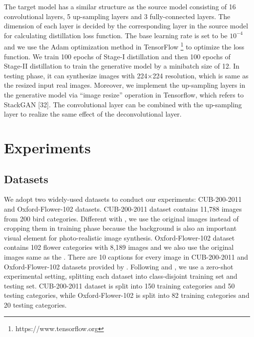 \documentclass[sigconf]{acmart}
\begin{document}
The target model has a similar structure as the source model consisting of 16 convolutional layers, 5 up-sampling layers and 3 fully-connected layers. The dimension of each layer is decided by the corresponding layer in the source model for calculating distillation loss function. The base learning rate is set to be $10^{-4}$ and we use the Adam optimization method \cite{kingma2014adam} in TensorFlow \footnote{https://www.tensorflow.org} to optimize the loss function. We train 100 epochs of Stage-I distillation and then 100 epochs of Stage-II distillation to train the generative model by a minibatch size of 12. In testing phase, it can synthesize images with 224$\times$224 resolution, which is same as the resized input real images. Moreover, we implement the up-sampling layers in the generative model via ``image resize'' operation in Tensorflow, which refers to StackGAN [32]. The convolutional layer can be combined with the up-sampling layer to realize the same effect of the deconvolutional layer.

\section{Experiments}



\subsection{Datasets}
We adopt two widely-used datasets to conduct our experiments: CUB-200-2011 \cite{wah2011caltech} and Oxford-Flower-102 \cite{nilsback2008automated} datasets. CUB-200-2011 dataset contains 11,788 images from 200 bird categories. Different with \cite{zhang2016stackgan}, we use the original images instead of cropping them in training phase because the background is also an important visual element for photo-realistic image synthesis. Oxford-Flower-102 dataset contains 102 flower categories with 8,189 images and we also use the original images same as the \cite{zhang2016stackgan}. There are 10 captions for every image in CUB-200-2011 and Oxford-Flower-102 datasets provided by \cite{reed2016learning}. Following \cite{reed2016generative} and \cite{zhang2016stackgan}, we use a zero-shot experimental setting, splitting each dataset into class-disjoint training set and testing set. CUB-200-2011 dataset is split into 150 training categories and 50 testing categories, while Oxford-Flower-102 is split into 82 training categories and 20 testing categories. 
\end{document}
